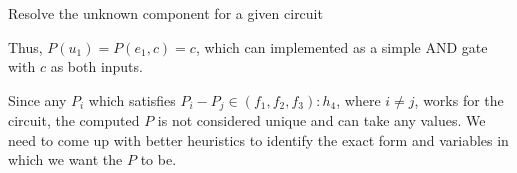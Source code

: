 \begin{algorithm}
\caption{Resolve the unknown component for a given circuit}
\label{algo:unknownComponent}
\begin{algorithmic}[1]

\Else
{}
\EndIf
\EndWhile
\EndProcedure


\EndProcedure
\end{algorithmic}
\end{algorithm}









Thus, $P(u_1)=P(e_1,c)=c$, which can implemented as a simple AND gate with $c$ as both inputs. 

Since any $P_i$ which satisfies $P_i-P_j\in(f_1,f_2,f_3):h_4$, where $i\neq j$, works for the circuit, the computed $P$ is not considered unique and can take any values. We need to come up with better heuristics to identify the exact form and variables in which we want the $P$ to be. 
